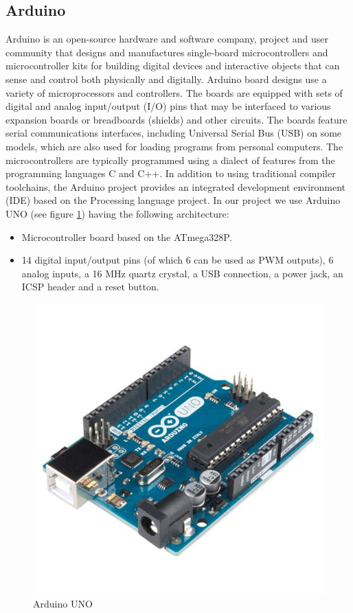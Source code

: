\subsection{Arduino}
\hspace{2cm}Arduino is an open-source hardware and software company, project and user community that designs and manufactures single-board microcontrollers and microcontroller kits for building digital devices and interactive objects that can sense and control both physically and digitally.
Arduino board designs use a variety of microprocessors and controllers. The boards are equipped with sets of digital and analog input/output (I/O) pins that may be interfaced to various expansion boards or breadboards (shields) and other circuits. The boards feature serial communications interfaces, including Universal Serial Bus (USB) on some models, which are also used for loading programs from personal computers. The microcontrollers are typically programmed using a dialect of features from the programming languages C and C++. In addition to using traditional compiler toolchains, the Arduino project provides an integrated development environment (IDE) based on the Processing language project.\cite{web017} 
In our project we use Arduino UNO (see figure \ref{fig:arduino uno}) having the following architecture: \\
\begin{itemize}
    \item Microcontroller board based on the ATmega328P.
    \item 14 digital input/output pins (of which 6 can be used as PWM outputs), 6 analog inputs, a 16 MHz quartz crystal, a USB connection, a power jack, an ICSP header and a reset button.\cite{web014}\\
\end{itemize}
\begin{figure}[H]%
    \center%
    \includegraphics[width=.5\textwidth]
    {images/Alzahraa/arduino_uno.jpg}%
    \caption[Arduino Uno]{Arduino UNO}\label{fig:arduino uno}%
  \end{figure} 

